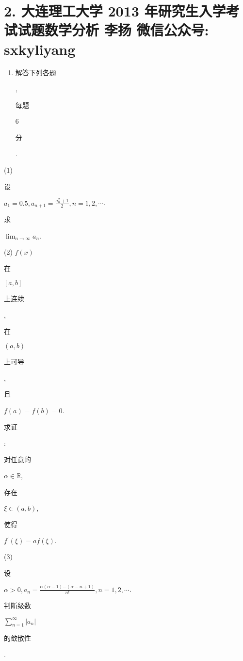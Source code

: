 \documentclass[10pt]{article}
\begin{document}
\section{2. 大连理工大学 2013 年研究生入学考试试题数学分析 
 李扬 
 微信公众号: sxkyliyang}
\begin{enumerate}
  \item \begin{CJK}{UTF8}{mj}解答下列各题\end{CJK}, \begin{CJK}{UTF8}{mj}每题\end{CJK} 6 \begin{CJK}{UTF8}{mj}分\end{CJK}.
\end{enumerate}
(1) \begin{CJK}{UTF8}{mj}设\end{CJK} $a_{1}=0.5, a_{n+1}=\frac{a_{n}^{2}+1}{2}, n=1,2, \cdots$. \begin{CJK}{UTF8}{mj}求\end{CJK} $\lim _{n \rightarrow \infty} a_{n}$.

(2) $f(x)$ \begin{CJK}{UTF8}{mj}在\end{CJK} $[a, b]$ \begin{CJK}{UTF8}{mj}上连续\end{CJK}, \begin{CJK}{UTF8}{mj}在\end{CJK} $(a, b)$ \begin{CJK}{UTF8}{mj}上可导\end{CJK}, \begin{CJK}{UTF8}{mj}且\end{CJK} $f(a)=f(b)=0$. \begin{CJK}{UTF8}{mj}求证\end{CJK}: \begin{CJK}{UTF8}{mj}对任意的\end{CJK} $\alpha \in \mathbb{R}$, \begin{CJK}{UTF8}{mj}存在\end{CJK} $\xi \in(a, b)$, \begin{CJK}{UTF8}{mj}使得\end{CJK} $f^{\prime}(\xi)=a f(\xi) .$

(3) \begin{CJK}{UTF8}{mj}设\end{CJK} $\alpha>0, a_{n}=\frac{\alpha(\alpha-1) \cdots(\alpha-n+1)}{n !}, n=1,2, \cdots$. \begin{CJK}{UTF8}{mj}判断级数\end{CJK} $\sum_{n=1}^{\infty}\left|a_{n}\right|$ \begin{CJK}{UTF8}{mj}的敛散性\end{CJK}.
\end{document}
